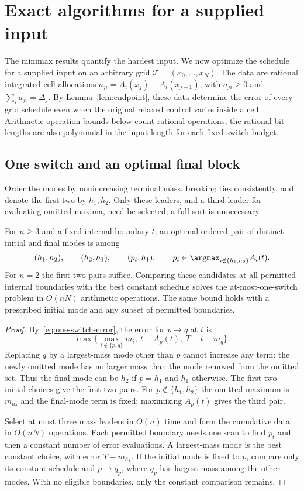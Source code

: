 \section{Exact algorithms for a supplied input}\label{sec:algorithms}

The minimax results quantify the hardest input. We now optimize the schedule
for a supplied input on an arbitrary grid $\mathcal T=(x_0,\ldots,x_N)$.
The data are rational integrated cell allocations
$a_{ji}=A_i(x_j)-A_i(x_{j-1})$, with $a_{ji}\ge0$ and
$\sum_i a_{ji}=\Delta_j$. By Lemma~\ref{lem:endpoint}, these data determine
the error of every grid schedule even when the original relaxed control
varies inside a cell. Arithmetic-operation bounds below count rational
operations; the rational bit lengths are also polynomial in the input length
for each fixed switch budget.

\subsection{One switch and an optimal final block}

Order the modes by nonincreasing terminal mass, breaking ties consistently,
and denote the first two by $h_1,h_2$. Only these leaders, and a third leader
for evaluating omitted maxima, need be selected; a full sort is unnecessary.

\begin{theorem}\label{thm:linear-one-switch}
For $n\ge3$ and a fixed internal boundary $t$, an optimal ordered pair of
distinct initial and final modes is among
\[
 (h_1,h_2),\qquad(h_2,h_1),\qquad(p_t,h_1),
 \qquad p_t\in\argmax_{i\notin\{h_1,h_2\}}A_i(t).
\]
For $n=2$ the first two pairs suffice. Comparing these candidates at all
permitted internal boundaries with the best constant schedule solves the
at-most-one-switch problem in $O(nN)$ arithmetic operations. The same bound
holds with a prescribed initial mode and any subset of permitted boundaries.
\end{theorem}
\begin{proof}
By~\eqref{eq:one-switch-error}, the error for $p\to q$ at $t$ is
\[
 \max\{\max_{i\notin\{p,q\}}m_i,\ t-A_p(t),\ T-t-m_q\}.
\]
Replacing $q$ by a largest-mass mode other than $p$ cannot increase any
term: the newly omitted mode has no larger mass than the mode removed from
the omitted set. Thus the final mode can be $h_2$ if $p=h_1$ and $h_1$
otherwise. The first two initial choices give the first two pairs. For
$p\notin\{h_1,h_2\}$ the omitted maximum is $m_{h_2}$ and the final-mode
term is fixed; maximizing $A_p(t)$ gives the third pair.

Select at most three mass leaders in $O(n)$ time and form the cumulative
data in $O(nN)$ operations. Each permitted boundary needs one scan to find
$p_t$ and then a constant number of error evaluations. A largest-mass mode
is the best constant choice, with error $T-m_{h_1}$. If the initial mode is
fixed to $p$, compare only its constant schedule and $p\to q_p$, where
$q_p$ has largest mass among the other modes. With no eligible boundaries,
only the constant comparison remains.
\end{proof}

